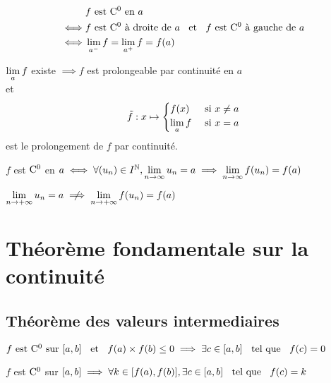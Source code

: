 \begin{prp}
\begin{align*}
    & f \est \co{0} \en a \\
\iff& f \est \co{0} \drt a \et f \est \co{0} \gch a \\
\iff& \lm_{a^-} f = \lm_{a^+} f = f(a) \\
\end{align*}
\end{prp}

\begin{dfn}
$\lm_a f$ existe $\implies f$ est prolongeable par continuité en $a$ \\
et 
\[
\tilde{f} : x \mapsto
\begin{cases}
f(x)    &\text{ si } x \neq a \\
\lm_a f &\text{ si } x = a
\end{cases}
\]
est le prolongement de $f$ par continuité.
\end{dfn}

\begin{prp}
$f$ est $\co{0}$ en $a \iff \forall (u_n) \in I^\N,
\lm_{n \to \infty} u_n = a \implies \lm_{n \to \infty} f(u_n) = f(a)$
\end{prp}

\begin{rem}
\begin{att}
$\lminf u_n = a \notimplies \lminf f(u_n) = f(a)$
\end{att}
\end{rem}

\section{Théorème fondamentale sur la continuité}

\subsection{Théorème des valeurs intermediaires}

\begin{thm}
$f \est \co{0} \text{ sur } {[a, b]} \et f(a) \times f(b) \leq 0
\implies \exists c \in {[a, b]} \tq f(c) = 0$
\end{thm}

\begin{thm}
$f$ est $\co{0}$ sur ${[a, b]} \implies 
\forall k \in {[f(a), f(b)]}, \exists c \in [a, b] \tq f(c) = k$
\end{thm}


